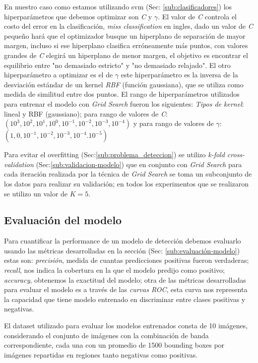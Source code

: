 En nuestro caso como estamos utilizando \ac{svm} (Sec: \ref{sub:clasificadores}) los hiperparámetros que debemos optimizar son \textit{C} y $\gamma$. El valor de \textit{C} controla el costo del error en la clasificación, \textit{miss classification} en ingles, dado un valor de \textit{C} pequeño hará que el optimizador busque un hiperplano de separación de mayor margen, incluso si ese hiperplano clasifica erróneamente más puntos, con valores grandes de \textit{C}  elegirá un hiperplano de menor margen, el objetivo es encontrar el equilibrio entre "no demasiado estricto" y  "no demasiado relajado". El otro hiperparámetro a  optimizar es el de  $\gamma$ este hiperparámetro es la inversa de la desviación estándar de un kernel \textit{RBF} (función gaussiana), que se utiliza como medida de similitud entre dos puntos.
El rango de hiperparámetros utilizados para entrenar el modelo con \textit{Grid Search} fueron los siguientes: \textit{Tipos de kernel}: lineal y RBF (gaussiano); para rango de valores de \textit{C}: $(10^{3}, 10^{2}, 10^{1}, 10^{0}, 10^{-1},10^{-2}, 10^{-3}, 10^{-4})$
    y para rango de valores de $\gamma$: $(1,0,10^{-1}, 10^{-2},10^{-3},10^{-4}. 10^{-5})$
    
Para evitar el overfitting (Sec:\ref{sub:problema_deteccion}) se utilizo \textit{k-fold cross-validation} (Sec:\ref{sub:validacion-modelo}) que en conjunto con \textit{Grid Search} para cada  iteración realizada por la técnica de \textit{Grid Search} se toma un subconjunto de los datos para realizar su validación; en todos los experimentos que se realizaron se utilizo un valor de $K = 5$.


\subsection*{Evaluación del modelo}\label{sub:evaluacion_class}

Para cuantificar la performance de un modelo de detección debemos evaluarlo usando las métricas desarrolladas en la sección (Sec: \ref{sub:evaluación-modelo}) estas son: \textit{precisión}, medida de cuantas predicciones positivas fueron verdaderas; \textit{recall}, nos indica la cobertura en la que el modelo predijo como positivo; \textit{accuracy}, obtenemos la exactitud del modelo; otra de las métricas desarrolladas para evaluar el modelo es a través de las \textit{curvas ROC}, esta curva nos representa la capacidad que tiene modelo entrenado en discriminar entre clases positivas y negativas.

El dataset utilizado para evaluar los modelos entrenados  consta de 10 imágenes, considerando el conjunto de imágenes con la combinación de banda correspondiente, cada una con un promedio de 1500 bounding boxes por imágenes repartidas en regiones tanto negativas como positivas.


